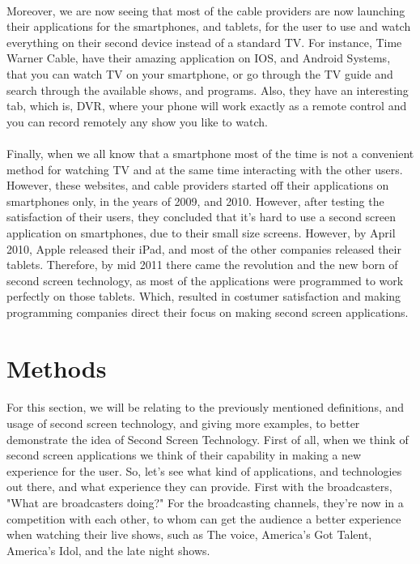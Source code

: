 \documentclass[12pt, oneside]{article}   	%
\begin{document}
 \paragraph{}
Moreover, we are now seeing that most of the cable providers are now launching their applications for the smartphones, and tablets, for the user to use and watch everything on their second device instead of a standard TV.  For instance, Time Warner Cable, have their amazing application on IOS, and Android Systems, that you can watch TV on your smartphone, or go through the TV guide and search through the available shows, and programs.  Also, they have an interesting tab, which is, DVR, where your phone will work exactly as a remote control and you can record remotely any show you like to watch.  
 \paragraph{}
 Finally, when we all know that a smartphone most of the time is not a convenient method for watching TV and at the same time interacting with the other users.  However, these websites, and cable providers started off their applications on smartphones only, in the years of 2009, and 2010.  However, after testing the satisfaction of their users, they concluded that it's hard to use a second screen application on smartphones, due to their small size screens.  However, by April 2010, Apple released their iPad, and most of the other companies released their tablets.  Therefore, by mid 2011 there came the revolution and the new born of second screen technology, as most of the applications were programmed to work perfectly on those tablets.  Which, resulted in costumer satisfaction and making programming companies direct their focus on making second screen applications.
 \section{Methods} 
 \paragraph{}
For this section, we will be relating to the previously mentioned definitions, and usage of second screen technology, and giving more examples, to better demonstrate the idea of Second Screen Technology. First of all, when we think of second screen applications we think of their capability in making a new  experience for the user.  So, let's see what kind of applications, and technologies out there, and what experience they can provide.  First with the broadcasters, "What are broadcasters doing?" \cite{Second-Screen-Art}  For the broadcasting channels, they're now in a competition with each other, to whom can get the audience a better experience when watching their live shows, such as The voice, America's Got Talent, America's Idol, and the late night shows.  
\end{document}
